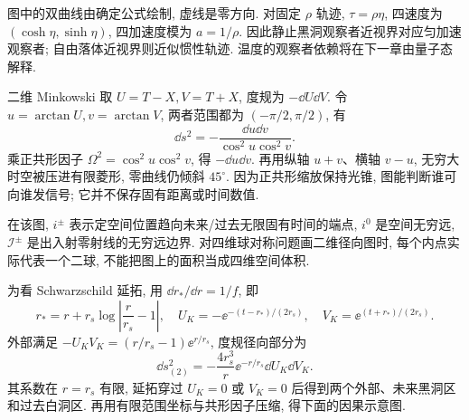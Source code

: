 \begin{center}
\end{center}
图中的双曲线由确定公式绘制, 虚线是零方向. 对固定 $\rho$ 轨迹, $\tau=\rho\eta$, 四速度为 $(\cosh\eta,\sinh\eta)$, 四加速度模为 $a=1/\rho$. 因此静止黑洞观察者近视界对应匀加速观察者; 自由落体近视界则近似惯性轨迹. 温度的观察者依赖将在下一章由量子态解释.

二维 Minkowski 取 $U=T-X,V=T+X$, 度规为 $-\dd U\dd V$. 令 $u=\arctan U,v=\arctan V$, 两者范围都为 $(-\pi/2,\pi/2)$, 有
\[
\dd s^2=-\frac{\dd u\dd v}{\cos^2u\cos^2v}.
\]
乘正共形因子 $\Omega^2=\cos^2u\cos^2v$, 得 $-\dd u\dd v$. 再用纵轴 $u+v$、横轴 $v-u$, 无穷大时空被压进有限菱形, 零曲线仍倾斜 $45^\circ$. 因为正共形缩放保持光锥, 图能判断谁可向谁发信号; 它并不保存固有距离或时间数值.

在该图, $i^\pm$ 表示定空间位置趋向未来/过去无限固有时间的端点, $i^0$ 是空间无穷远, $\mathcal I^\pm$ 是出入射零射线的无穷远边界. 对四维球对称问题画二维径向图时, 每个内点实际代表一个二球, 不能把图上的面积当成四维空间体积.

为看 Schwarzschild 延拓, 用 $\dd r_*/\dd r=1/f$, 即
\[
r_*=r+r_s\log\left|\frac r{r_s}-1\right|,
\quad U_K=-\ee^{-(t-r_*)/(2r_s)},\quad
V_K=\ee^{(t+r_*)/(2r_s)}.
\]
外部满足 $-U_KV_K=(r/r_s-1)\ee^{r/r_s}$, 度规径向部分为
\[
\dd s^2_{(2)}=-\frac{4r_s^3}{r}\ee^{-r/r_s}\dd U_K\dd V_K.
\]
其系数在 $r=r_s$ 有限, 延拓穿过 $U_K=0$ 或 $V_K=0$ 后得到两个外部、未来黑洞区和过去白洞区. 再用有限范围坐标与共形因子压缩, 得下面的因果示意图.

